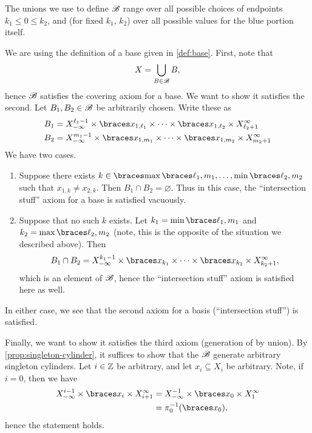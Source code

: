 \documentclass{fkpaper}
\begin{document}
\begin{multicols}{2}
  The unions we use to define ${\mathscr{B}}$ range over all possible choices
  of endpoints $k_1 \leq 0 \leq k_2$, and (for fixed $k_1$, $k_2$)
  over all possible values for the blue portion itself.
  \begin{sproof}
    We are using the definition of a base given in \cref{def:base}.
    First, note that
    \[
      X = \bigcup_{B \in {\mathscr{B}}} B,
    \]
    hence ${\mathscr{B}}$ satisfies the covering axiom for a base. We want to
    show it satisfies the second. Let $B_1, B_2 \in {\mathscr{B}}$ be
    arbitrarily chosen. Write these as
    \begin{align*}
      B_1
      &= X_{-\infty}^{\ell_1-1}\times \set{x_{1,\ell_1} } \times
        \cdots \times \set{x_{1,\ell_2}} \times X_{\ell_2+1}^\infty \\
      B_2
      &= X_{-\infty}^{m_1-1}\times \set{x_{1,m_1} } \times \cdots \times
        \set{x_{1,m_2}} \times X_{m_2+1}^\infty
    \end{align*}
    We have two cases.
    \begin{enumerate}
      \item Suppose there exists $k \in \set{\max\set{\ell_1, m_1},
        \ldots, \min\set{\ell_2, m_2}}$ such that $x_{1,k} \neq
        x_{2,k}$. Then $B_1 \cap B_2 = \varnothing$. Thus in this case,
        the ``intersection stuff'' axiom for a base is satisfied
        vacuously. \cmark
      \item Suppose that no such $k$ exists. Let $k_1 = \min\set{\ell_1,
        m_1}$ and $k_2 = \max\set{\ell_2, m_2}$ (note, this is the
        opposite of the situation we described above). Then
        \[
        B_1 \cap B_2 = X_{-\infty}^{k_1 - 1} \times \set{x_{k_1}} \times
        \cdots \times \set{x_{k_2}} \times X_{k_2+1}^\infty,
        \]
        which is an element of ${\mathscr{B}}$, hence the ``intersection stuff''
        axiom is satisfied here as well. \cmark
    \end{enumerate}
    In either case, we see that the second axiom for a basis
    (``intersection stuff'') is satisfied.

    Finally, we want to show it satisfies the third axiom (generation of
    by union). By \cref{prop:singleton-cylinder}, it suffices to show
    that the ${\mathscr{B}}$ generate arbitrary singleton cylinders. Let $i \in
    \mathbb{Z}$ be arbitrary, and let $x_i \subseteq X_i$ be arbitrary. Note,
    if $i = 0$, then we have
    \begin{align*}
      X_{-\infty}^{i-1} \times \set{x_i} \times X_{i+1}^{\infty}
      &= X_{-\infty}^{-1} \times \set{x_0} \times X_{1}^{\infty} \\
      &= \pi_{0}^{-1}(\set{x_0}),
    \end{align*}
    hence the statement holds.


\end{sproof}
\end{multicols}
\end{document}
